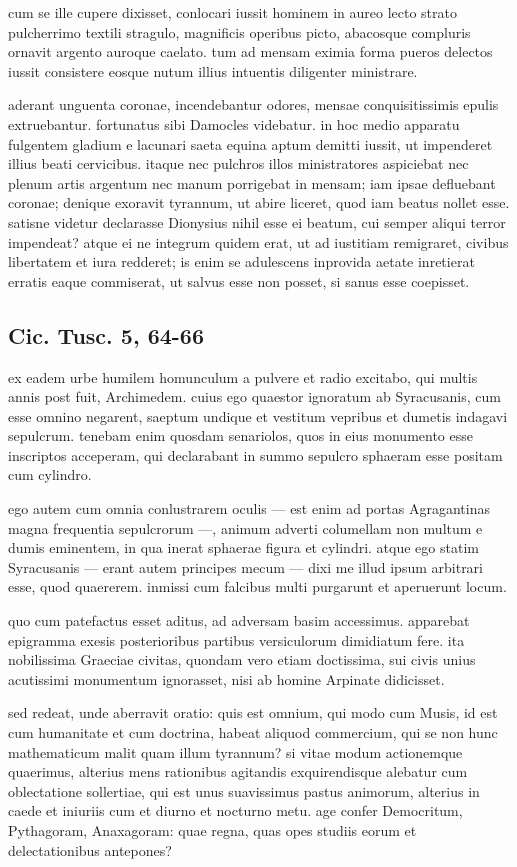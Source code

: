 cum se ille cupere dixisset, conlocari iussit hominem in aureo lecto strato pulcherrimo textili stragulo, magnificis operibus picto, abacosque compluris ornavit argento auroque caelato. tum ad mensam eximia forma pueros delectos iussit consistere eosque nutum illius intuentis diligenter ministrare.

aderant unguenta coronae, incendebantur odores, mensae conquisitissimis epulis extruebantur. fortunatus sibi Damocles videbatur. in hoc medio apparatu fulgentem gladium e lacunari saeta equina aptum demitti iussit, ut impenderet illius beati cervicibus. itaque nec pulchros illos ministratores aspiciebat nec plenum artis argentum nec manum porrigebat in mensam; iam ipsae defluebant coronae; denique exoravit tyrannum, ut abire liceret, quod iam beatus nollet esse. satisne videtur declarasse Dionysius nihil esse ei beatum, cui semper aliqui terror impendeat? atque ei ne integrum quidem erat, ut ad iustitiam remigraret, civibus libertatem et iura redderet; is enim se adulescens inprovida aetate inretierat erratis eaque commiserat, ut salvus esse non posset, si sanus esse coepisset.

\subsection*{Cic. Tusc. 5, 64-66}


ex eadem urbe humilem homunculum a pulvere et radio excitabo, qui multis annis post fuit, Archimedem. cuius ego quaestor ignoratum ab Syracusanis, cum esse omnino negarent, saeptum undique et vestitum vepribus et dumetis indagavi sepulcrum. tenebam enim quosdam senariolos, quos in eius monumento esse inscriptos acceperam, qui declarabant in summo sepulcro sphaeram esse positam cum cylindro.

ego autem cum omnia conlustrarem oculis — est enim ad portas Agragantinas magna frequentia sepulcrorum —, animum adverti columellam non multum e dumis eminentem, in qua inerat sphaerae figura et cylindri. atque ego statim Syracusanis — erant autem principes mecum — dixi me illud ipsum arbitrari esse, quod quaererem. inmissi cum falcibus multi purgarunt et aperuerunt locum.

quo cum patefactus esset aditus, ad adversam basim accessimus. apparebat epigramma exesis posterioribus partibus versiculorum dimidiatum fere. ita nobilissima Graeciae civitas, quondam vero etiam doctissima, sui civis unius acutissimi monumentum ignorasset, nisi ab homine Arpinate didicisset. 

sed redeat, unde aberravit oratio: quis est omnium, qui modo cum Musis, id est cum humanitate et cum doctrina, habeat aliquod commercium, qui se non hunc mathematicum malit quam illum tyrannum? si vitae modum actionemque quaerimus, alterius mens rationibus agitandis exquirendisque alebatur cum oblectatione sollertiae, qui est unus suavissimus pastus animorum, alterius in caede et iniuriis cum et diurno et nocturno metu. age confer Democritum, Pythagoram, Anaxagoram: quae regna, quas opes studiis eorum et delectationibus antepones?
